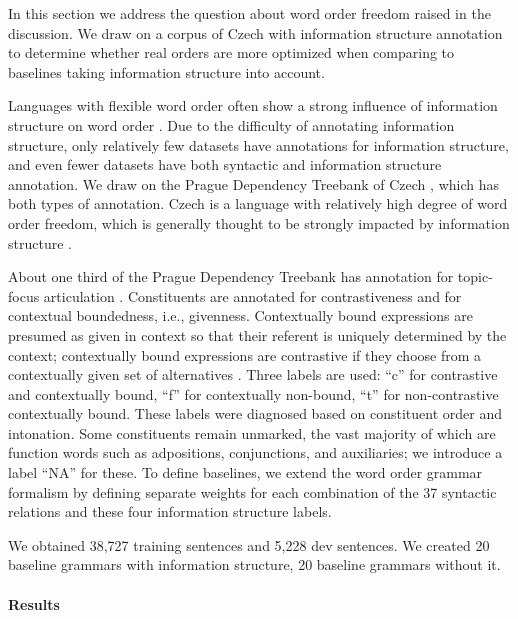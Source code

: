 

In this section we address the question about word order freedom raised in the discussion.
We draw on a corpus of Czech with information structure annotation to determine whether real orders are more optimized when comparing to baselines taking information structure into account.



Languages with flexible word order often show a strong influence of information structure on word order \citep{givon1988pragmatics,jacobs1988probleme,neeleman2016word}.
Due to the difficulty of annotating information structure, only relatively few datasets have annotations for information structure, and even fewer datasets have both syntactic and information structure annotation.
We draw on the Prague Dependency Treebank of Czech \citep{bohmova2003prague,mikulova2006annotation}, which has both types of annotation.
Czech is a language with relatively high degree of word order freedom, which is generally thought to be strongly impacted by information structure \citep{firbas1966defining,firbas1974aspects}.

About one third of the Prague Dependency Treebank has annotation for topic-focus articulation \citep{mikulova2006annotation}.
Constituents are annotated for contrastiveness and for contextual boundedness, i.e., givenness.
Contextually bound expressions are presumed as given in context so that their referent is uniquely determined by the context; contextually bound expressions are contrastive if they choose from a contextually given set of alternatives \citep[Section 10.2]{mikulova2006annotation}.
Three labels are used:
``c'' for contrastive and contextually bound, ``f'' for contextually non-bound, ``t'' for non-contrastive contextually bound.
These labels were diagnosed based on constituent order and intonation.
Some constituents remain unmarked, the vast majority of which are function words such as adpositions, conjunctions, and auxiliaries; we introduce a label ``NA'' for these.
To define baselines, we extend the word order grammar formalism by defining separate weights for each combination of the 37 syntactic relations and these four information structure labels.

We obtained 38,727 training sentences and 5,228 dev sentences. We created 20 baseline grammars with information structure, 20 baseline grammars without it.

\paragraph{Results}

